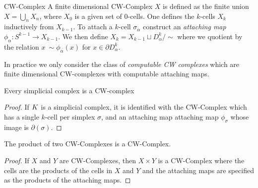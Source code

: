 \begin{definition}{CW-Complex}
 A finite dimensional CW-Complex $X$ is defined as the finite union $X = \bigcup_n X_n$, where $X_0$ is a given set of $0$-cells. One defines the $k$-cells $X_k$ inductively from $X_{k-1}$. To attach a $k$-cell $\sigma_\alpha$ construct an \emph{attaching map} $\phi_\alpha: S^{k-1} \rightarrow X_{k-1}$. We then define $X_k = X_{k-1} \sqcup D^k_\alpha / \sim$ where we quotient by the relation $x ~\sim \phi_\alpha(x)$ for $x \in \partial D^k_\alpha$. 
\end{definition}
In practice we only consider the class of  \emph{computable CW complexes} which are finite dimensional CW-complexes with computable attaching maps.
\begin{lemma}
Every simplicial complex is a CW-complex
\label{lem:simp-is-cw}
\end{lemma}
\begin{proof}
If $K$ is a simplicial complex, it is identified with the CW-Complex which has a single $k$-cell per simplex $\sigma$, and an attaching map attaching map $\phi_\sigma$ whose image is $\partial(\sigma)$.  
\end{proof}
\begin{lemma}
The product of two CW-Complexes is a CW-Complex.
\label{lem:cw-complex-product}
\end{lemma}
\begin{proof}
If $X$ and $Y$ are CW-Complexes, then $X \times Y$ is a CW-Complex where the cells are the products of the cells in $X$ and $Y$ and the attaching maps are specified as the products of the attaching maps.
\end{proof}

